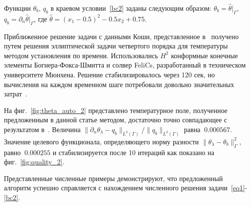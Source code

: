 \documentclass[12pt]{article}
\begin{document}
    Функции $\theta_b$, $q_b$ в краевом условии~\eqref{bc2} заданы следующим образом:
    $\theta_b = \widehat{\theta}|_{\Gamma}$, $q_b = \partial_n \widehat{\theta}|_{\Gamma}$, где
    $\widehat{\theta} = (x_1-0.5)^2 - 0.5x_2+0.75$.

    Приближенное решение задачи с данными Коши, представленное в~\cite{CNSNS19}
    получено путем решения эллиптической задачи четвертого
    порядка для температуры методом установления по времени.
    Использовались $H^2$ конформные конечные элементы Богнера-Фокса-Шмитта и
    солвер FeliCs, разработанный в техническом университете Мюнхена.
    Решение стабилизировалось через 120 сек, но вычисления на каждом временном
    шаге потребовали довольно значительных затрат~\cite{CNSNS19}.

    На фиг.~\ref{fig:theta_auto_2} представлено температурное поле, полученное
    предложенным в данной статье методом, достаточно точно совпадающее с результатом в~\cite{CNSNS19}.
    Величина $\|\partial_n\theta_\lambda-q_b\|_{L^2(\Gamma)}/\|q_b\|_{L^2(\Gamma)}$ равна $~0.000567$.
    Значение целевого функционала, определяющего норму разности $\|\theta_\lambda -\theta_b\|^2_\Gamma$,
    равно $~0.000255$ и стабилизируется после 10 итераций как показано на фиг.~\ref{fig:quality_2}.

  

    Представленные численные примеры демонстрируют, что предложенный алгоритм успешно справляется
    с нахождением численного решения задачи~\eqref{eq1}-\eqref{bc2}.
\end{document}
